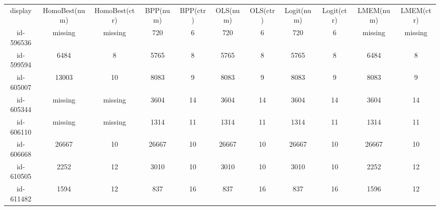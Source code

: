 \begin{tabular}{ccccccccccc}
display & HomoBest(num) & HomoBest(ctr) & BPP(num) & BPP(ctr) & OLS(num) & OLS(ctr) & Logit(num) & Logit(ctr) & LMEM(num) & LMEM(ctr)\\
id-596536 & missing & missing & 720 & 6 & 720 & 6 & 720 & 6 & missing & missing\\
id-599594 & 6484 & 8 & 5765 & 8 & 5765 & 8 & 5765 & 8 & 6484 & 8\\
id-605007 & 13003 & 10 & 8083 & 9 & 8083 & 9 & 8083 & 9 & 8083 & 9\\
id-605344 & missing & missing & 3604 & 14 & 3604 & 14 & 3604 & 14 & 3604 & 14\\
id-606110 & missing & missing & 1314 & 11 & 1314 & 11 & 1314 & 11 & 1314 & 11\\
id-606668 & 26667 & 10 & 26667 & 10 & 26667 & 10 & 26667 & 10 & 26667 & 10\\
id-610505 & 2252 & 12 & 3010 & 10 & 3010 & 10 & 3010 & 10 & 2252 & 12\\
id-611482 & 1594 & 12 & 837 & 16 & 837 & 16 & 837 & 16 & 1596 & 12\\
\end{tabular}
